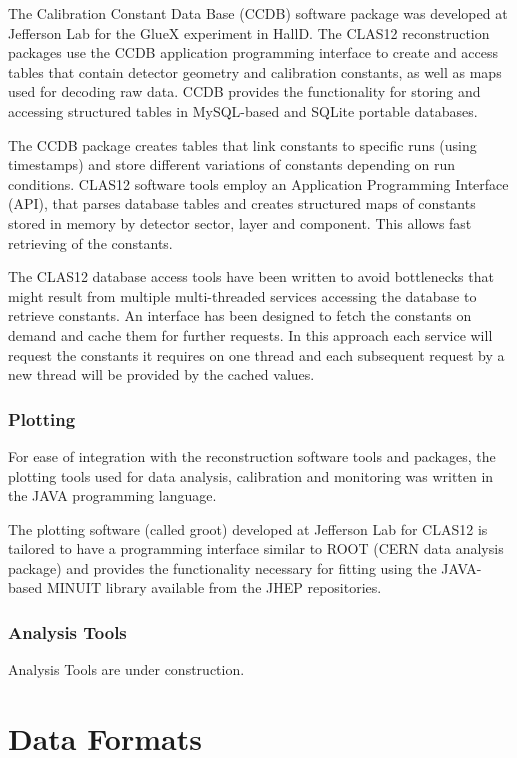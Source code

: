 \documentclass{elsart}
\begin{document}
The Calibration Constant Data Base (CCDB) software package was developed at Jefferson Lab for the GlueX experiment 
in HallD.  The CLAS12 reconstruction packages use the CCDB application programming interface to create and access 
tables that contain detector geometry and calibration constants, as well as maps used for decoding raw data.
CCDB provides the functionality for storing and accessing 
structured tables in MySQL-based and SQLite portable databases. 

The CCDB package creates
tables that link constants to specific runs (using timestamps) and store different variations of constants depending on run
conditions. CLAS12 software tools employ an Application Programming Interface (API), that parses database tables and creates
structured maps of constants stored in  memory by detector sector, layer and component. This allows fast retrieving of the 
constants.

The CLAS12 database access tools have been written to avoid bottlenecks that might result from multiple multi-threaded 
services accessing the database to retrieve constants.  An interface has been designed to fetch the constants 
on demand and cache them for further requests. In this approach each service will request the
 constants it requires on one thread and each subsequent request by a new thread will be provided by the cached values.

\subsubsection{Plotting}

For ease of integration with the reconstruction software tools and packages, the plotting tools used for data 
analysis, calibration and monitoring was written in the JAVA programming language. 

The plotting software (called groot) developed at Jefferson Lab for CLAS12 is tailored to have a programming 
interface similar to ROOT
(CERN data analysis package) and provides the functionality necessary for 
fitting using the JAVA-based MINUIT library available from the JHEP repositories.

\subsubsection{Analysis Tools}

Analysis Tools are under construction.

\section{Data Formats}
\end{document}
